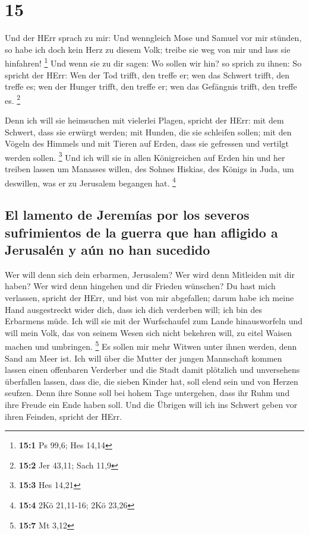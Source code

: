 \hypertarget{section-14}{%
\section{15}\label{section-14}}

 Und der HErr sprach zu mir: Und wenngleich Mose und
Samuel vor mir stünden, so habe ich doch kein Herz zu diesem Volk;
treibe sie weg von mir und lass sie hinfahren! \footnote{\textbf{15:1}
  Ps 99,6; Hes 14,14}  Und wenn sie zu dir sagen: Wo
sollen wir hin? so sprich zu ihnen: So spricht der HErr: Wen der Tod
trifft, den treffe er; wen das Schwert trifft, den treffe es; wen der
Hunger trifft, den treffe er; wen das Gefängnis trifft, den treffe es.
\footnote{\textbf{15:2} Jer 43,11; Sach 11,9}

 Denn ich will sie heimsuchen mit vielerlei Plagen,
spricht der HErr: mit dem Schwert, dass sie erwürgt werden; mit Hunden,
die sie schleifen sollen; mit den Vögeln des Himmels und mit Tieren auf
Erden, dass sie gefressen und vertilgt werden sollen. \footnote{\textbf{15:3}
  Hes 14,21}  Und ich will sie in allen Königreichen auf
Erden hin und her treiben lassen um Manasses willen, des Sohnes Hiskias,
des Königs in Juda, um deswillen, was er zu Jerusalem begangen hat.
\footnote{\textbf{15:4} 2Kö 21,11-16; 2Kö 23,26}

\hypertarget{el-lamento-de-jeremuxedas-por-los-severos-sufrimientos-de-la-guerra-que-han-afligido-a-jerusaluxe9n-y-auxfan-no-han-sucedido}{%
\subsection{El lamento de Jeremías por los severos sufrimientos de la
guerra que han afligido a Jerusalén y aún no han
sucedido}\label{el-lamento-de-jeremuxedas-por-los-severos-sufrimientos-de-la-guerra-que-han-afligido-a-jerusaluxe9n-y-auxfan-no-han-sucedido}}

 Wer will denn sich dein erbarmen, Jerusalem? Wer wird
denn Mitleiden mit dir haben? Wer wird denn hingehen und dir Frieden
wünschen?  Du hast mich verlassen, spricht der HErr, und
bist von mir abgefallen; darum habe ich meine Hand ausgestreckt wider
dich, dass ich dich verderben will; ich bin des Erbarmens müde.
 Ich will sie mit der Wurfschaufel zum Lande hinausworfeln
und will mein Volk, das von seinem Wesen sich nicht bekehren will, zu
eitel Waisen machen und umbringen. \footnote{\textbf{15:7} Mt 3,12}
 Es sollen mir mehr Witwen unter ihnen werden, denn Sand
am Meer ist. Ich will über die Mutter der jungen Mannschaft kommen
lassen einen offenbaren Verderber und die Stadt damit plötzlich und
unversehens überfallen lassen,  dass die, die sieben
Kinder hat, soll elend sein und von Herzen seufzen. Denn ihre Sonne soll
bei hohem Tage untergehen, dass ihr Ruhm und ihre Freude ein Ende haben
soll. Und die Übrigen will ich ins Schwert geben vor ihren Feinden,
spricht der HErr.

